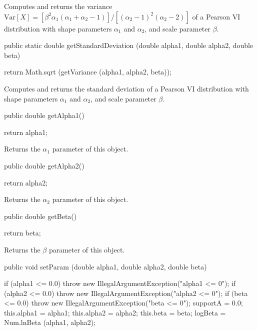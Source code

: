\begin{tabb}
   Computes and returns the variance
   $\mbox{Var}[X] = [\beta^2 \alpha_1 (\alpha_1 + \alpha_2 - 1)] /
    [(\alpha_2 - 1)^2(\alpha_2 - 2)]$ of a Pearson VI distribution with shape
   parameters $\alpha_1$ and $\alpha_2$, and scale parameter $\beta$.
\end{tabb}
\begin{code}

   public static double getStandardDeviation (double alpha1, double alpha2,
                                              double beta)\begin{hide} {
      return Math.sqrt (getVariance (alpha1, alpha2, beta));
   }\end{hide}
\end{code}
\begin{tabb}
   Computes and returns the standard deviation of a Pearson VI
distribution with shape
   parameters $\alpha_1$ and $\alpha_2$, and scale parameter $\beta$.
\end{tabb}
\begin{code}

   public double getAlpha1()\begin{hide} {
      return alpha1;
   }\end{hide}
\end{code}
\begin{tabb}
   Returns the $\alpha_1$ parameter of this object.
\end{tabb}
\begin{code}

   public double getAlpha2()\begin{hide} {
      return alpha2;
   }\end{hide}
\end{code}
\begin{tabb}
   Returns the $\alpha_2$ parameter of this object.
\end{tabb}
\begin{code}

   public double getBeta()\begin{hide} {
      return beta;
   }\end{hide}
\end{code}
\begin{tabb}
   Returns the $\beta$ parameter of this object.
\end{tabb}
\begin{code}

   public void setParam (double alpha1, double alpha2, double beta)\begin{hide} {
      if (alpha1 <= 0.0)
         throw new IllegalArgumentException("alpha1 <= 0");
      if (alpha2 <= 0.0)
         throw new IllegalArgumentException("alpha2 <= 0");
      if (beta <= 0.0)
         throw new IllegalArgumentException("beta <= 0");
      supportA = 0.0;
      this.alpha1 = alpha1;
      this.alpha2 = alpha2;
      this.beta = beta;
      logBeta = Num.lnBeta (alpha1, alpha2);
   }\end{hide}
\end{code}
